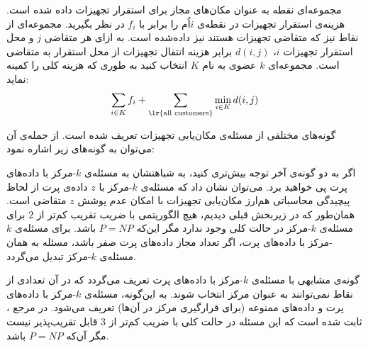 مجموعه‌ای نقطه به عنوان مکان‌های مجاز برای استقرار تجهیزات داده شده است.
هزینه‌ی استقرار تجهیزات در نقطه‌ی $i$اُم را برابر با $f_i$ در نظر بگیرید.
مجموعه‌ای از نقاط نیز که متقاضی تجهیزات هستند نیز داده‌شده است.
به ازای هر متقاضی $j$ و محل استقرار تجهیزات $i$، $d(i, j)$ برابر هزینه انتقال تجهیزات از محل استقرار به متقاضی است.
مجموعه‌ای $k$ عضوی به نام $K$ انتخاب کنید به طوری که هزینه کلی را کمینه نماید:
$$\sum_{i \in K} f_i + \sum_{\lr{\text{all customers}}}{\min_{i \in K} d(i, j)}$$


 گونه‌های مختلفی از مسئله‌ی مکان‌یابی تجهیزات تعریف شده است.
از جمله‌ی آن می‌توان به گونه‌های زیر اشاره نمود:







اگر به دو گونه‌ی آخر توجه بیش‌تری کنید، به شباهتشان به مسئله‌ی $k$-مرکز با داده‌های پرت پی خواهید برد.
می‌توان نشان داد که مسئله‌ی $k$-مرکز با $z$ داده‌ی پرت از لحاظ پیچیدگی محاسباتی هم‌ارز مکان‌یابی تجهیزات با امکان عدم پوشش $z$ متقاضی است.
همان‌طور که در زیربخش قبلی دیدیم، هیچ الگوریتمی با ضریب تقریب کم‌تر از $2$ برای مسئله‌ی $k$-مرکز در حالت کلی وجود ندارد مگر این‌که $P = NP$ باشد.
برای مسئله‌ی $k$-مرکز با داده‌های پرت، اگر تعداد مجاز داده‌های پرت صفر باشد، مسئله به همان مسئله‌ی $k$-مرکز تبدیل می‌گردد.

گونه‌ی مشابهی با مسئله‌ی $k$-مرکز با داده‌های پرت تعریف می‌گردد که در آن تعدادی از نقاط نمی‌توانند به عنوان مرکز انتخاب شوند.
به این‌گونه، مسئله‌ی $k$-مرکز با داده‌های پرت و داده‌های ممنوعه (برای قرارگیری مرکز در آن‌ها) تعریف می‌شود.
در مرجع ، ثابت شده است که این مسئله در حالت کلی با ضریب کم‌تر از $3$ قابل تقریب‌پذیر نیست مگر آن‌که $P = NP$ باشد. 

